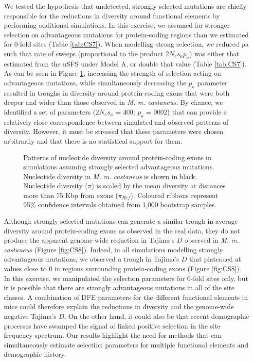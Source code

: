 	We tested the hypothesis that undetected, strongly selected mutations are chiefly responsible for the reductions in diversity around functional elements by performing additional simulations. In this exercise, we assumed far stronger selection on advantageous mutations for protein-coding regions than we estimated for 0-fold sites (Table \ref{tab:CS7}). When modelling strong selection, we reduced pa such that rate of sweeps (proportional to the product $2N_es_ap_a$) was either that estimated from the uSFS under Model A, or double that value (Table \ref{tab:CS7}). As can be seen in Figure \ref{fig:strongSelection}, increasing the strength of selection acting on advantageous mutations, while simultaneously decreasing the $p_a$ parameter resulted in troughs in diversity around protein-coding exons that were both deeper and wider than those observed in \textit{M. m. castaneus}. By chance, we identified a set of parameters ($2N_es_a$ = 400; $p_a$ = 0002) that can provide a relatively close correspondence between simulated and observed patterns of diversity. However, it must be stressed that these parameters were chosen arbitrarily and that there is no statistical support for them.

\begin{figure}[H]
   \centering      
   \noindent{}
 \caption[Reductions in diversity around exons caused by strong positive selection]{Patterns of nucleotide diversity around protein-coding exons in simulations assuming strongly selected advantageous mutations. Nucleotide diversity in \textit{M. m. castaneus} is shown in black. Nucleotide diversity ($\pi$) is scaled by the mean diversity at distances more than 75 Kbp from exons ($\pi_{Ref}$). Coloured ribbons represent 95\% confidence intervals obtained from 1,000 bootstrap samples.}
 \label{fig:strongSelection}
\end{figure}

	Although strongly selected mutations can generate a similar trough in average diversity around protein-coding exons as observed in the real data, they do not produce the apparent genome-wide reduction in Tajima’s $D$ observed in \textit{M. m. castaneus} (Figure \ref{fig:CS8}). Indeed, in all simulations modelling strongly advantageous mutations, we observed a trough in Tajima’s $D$ that plateaued at values close to 0 in regions surrounding protein-coding exons (Figure \ref{fig:CS8}). In this exercise, we manipulated the selection parameters for 0-fold sites only, but it is possible that there are strongly advantageous mutations in all of the site classes. A combination of DFE parameters for the different functional elements in mice could therefore explain the reductions in diversity and the genome-wide negative Tajima’s $D$. On the other hand, it could also be that recent demographic processes have swamped the signal of linked positive selection in the site frequency spectrum.  Our results highlight the need for methods that can simultaneously estimate selection parameters for multiple functional elements and demographic history. 

